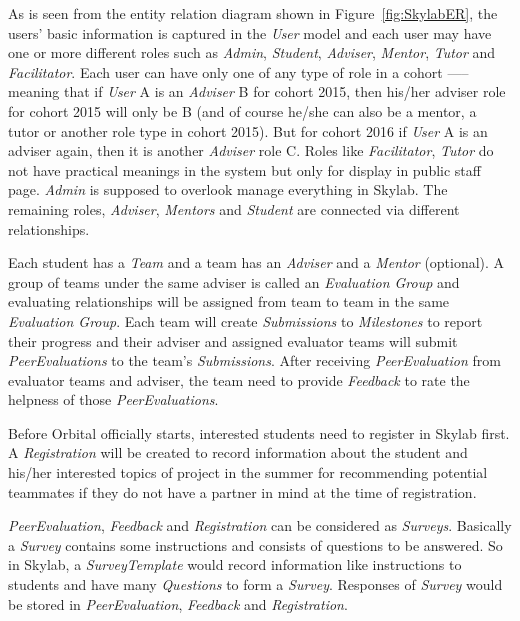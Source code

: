 As is seen from the entity relation diagram shown in Figure~\ref{fig:SkylabER}, the users' basic information is captured in the \textit{User} model and each user may have one or more different roles such as \textit{Admin}, \textit{Student}, \textit{Adviser}, \textit{Mentor}, \textit{Tutor} and \textit{Facilitator}. Each user can have only one of any type of role in a cohort —-- meaning that if \textit{User} A is an \textit{Adviser} B for cohort 2015, then his/her adviser role for cohort 2015 will only be B (and of course he/she can also be a mentor, a tutor or another role type in cohort 2015). But for cohort 2016 if \textit{User} A is an adviser again, then it is another \textit{Adviser} role C. Roles like \textit{Facilitator}, \textit{Tutor} do not have practical meanings in the system but only for display in public staff page. \textit{Admin} is supposed to overlook manage everything in Skylab. The remaining roles, \textit{Adviser}, \textit{Mentors} and \textit{Student} are connected via different relationships.

Each student has a \textit{Team} and a team has an \textit{Adviser} and a \textit{Mentor} (optional). A group of teams under the same adviser is called an \textit{Evaluation Group} and evaluating relationships will be assigned from team to team in the same \textit{Evaluation Group}. Each team will create \textit{Submissions} to \textit{Milestones} to report their progress and their adviser and assigned evaluator teams will submit \textit{PeerEvaluations} to the team's \textit{Submissions}. After receiving \textit{PeerEvaluation} from evaluator teams and adviser, the team need to provide \textit{Feedback} to rate the helpness of those \textit{PeerEvaluations}.

Before Orbital officially starts, interested students need to register in Skylab first. A \textit{Registration} will be created to record information about the student and his/her interested topics of project in the summer for recommending potential teammates if they do not have a partner in mind at the time of registration.

\textit{PeerEvaluation}, \textit{Feedback} and \textit{Registration} can be considered as \textit{Surveys}. Basically a \textit{Survey} contains some instructions and consists of questions to be answered. So in Skylab, a \textit{SurveyTemplate} would record information like instructions to students and have many \textit{Questions} to form a \textit{Survey}. Responses of \textit{Survey} would be stored in \textit{PeerEvaluation}, \textit{Feedback} and \textit{Registration}.

